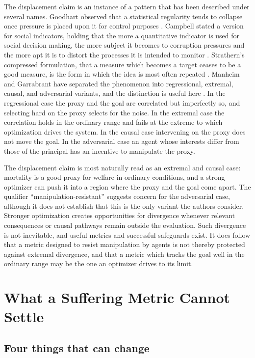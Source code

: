 \documentclass[11pt]{article}
\begin{document}
The displacement claim is an instance of a pattern that has been described under several names. Goodhart observed that a statistical regularity tends to collapse once pressure is placed upon it for control purposes \citep{goodhart1975}. Campbell stated a version for social indicators, holding that the more a quantitative indicator is used for social decision making, the more subject it becomes to corruption pressures and the more apt it is to distort the processes it is intended to monitor \citep{campbell1979}. Strathern's compressed formulation, that a measure which becomes a target ceases to be a good measure, is the form in which the idea is most often repeated \citep{strathern1997}. Manheim and Garrabrant have separated the phenomenon into regressional, extremal, causal, and adversarial variants, and the distinction is useful here \citep{manheim2018}. In the regressional case the proxy and the goal are correlated but imperfectly so, and selecting hard on the proxy selects for the noise. In the extremal case the correlation holds in the ordinary range and fails at the extreme to which optimization drives the system. In the causal case intervening on the proxy does not move the goal. In the adversarial case an agent whose interests differ from those of the principal has an incentive to manipulate the proxy.

The displacement claim is most naturally read as an extremal and causal case: mortality is a good proxy for welfare in ordinary conditions, and a strong optimizer can push it into a region where the proxy and the goal come apart. The qualifier ``manipulation-resistant'' suggests concern for the adversarial case, although it does not establish that this is the only variant the authors consider. Stronger optimization creates opportunities for divergence whenever relevant consequences or causal pathways remain outside the evaluation. Such divergence is not inevitable, and useful metrics and successful safeguards exist. It does follow that a metric designed to resist manipulation by agents is not thereby protected against extremal divergence, and that a metric which tracks the goal well in the ordinary range may be the one an optimizer drives to its limit.

\section{What a Suffering Metric Cannot Settle}

\subsection{Four things that can change}
\end{document}

